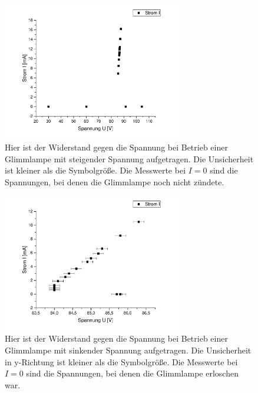 \documentclass[
	a4paper,
	12pt,
	pagesize,
	ngerman
]{scrartcl}
\begin{document}
	\begin{figure}[H]
		\includegraphics[width=0.7\textwidth]{glimm_steig}
		\centering
		\caption{Hier ist der Widerstand gegen die Spannung bei Betrieb einer Glimmlampe mit steigender Spannung aufgetragen. Die Unsicherheit ist kleiner als die Symbolgröße. Die Messwerte bei $I=0$ sind die Spannungen, bei denen die Glimmlampe noch nicht zündete.}
		\label{glimm_steig}
		\centering
	\end{figure}
	\begin{figure}[H]
		\includegraphics[width=0.7\textwidth]{glimm_fall}
		\centering
		\caption{Hier ist der Widerstand gegen die Spannung bei Betrieb einer Glimmlampe mit sinkender Spannung aufgetragen. Die Unsicherheit in y-Richtung ist kleiner als die Symbolgröße. Die Messwerte bei $I=0$ sind die Spannungen, bei denen die Glimmlampe erloschen war.}
		\label{glimm_fall}
		\centering
	\end{figure}
\end{document}
